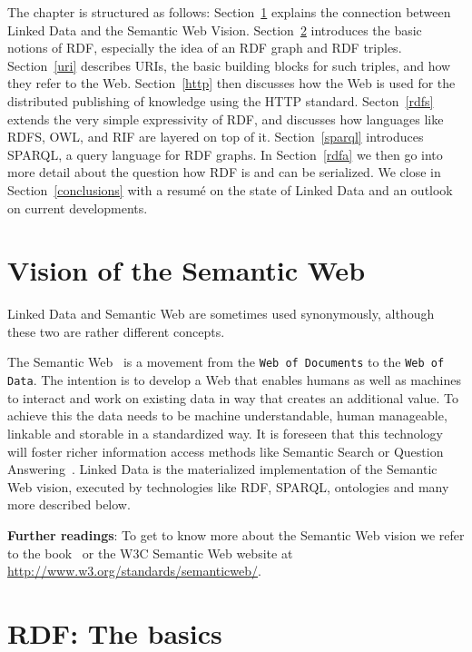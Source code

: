 The chapter is structured as follows:
Section~\ref{semanticweb} explains the connection between Linked Data and the Semantic Web Vision.
Section~\ref{rdf} introduces the basic notions of RDF, especially the idea of an RDF graph and RDF triples.
Section~\ref{uri} describes URIs, the basic building blocks for such triples, and how they refer to the Web.
Section~\ref{http} then discusses how the Web is used for the distributed publishing of knowledge using the HTTP standard.
Secton~\ref{rdfs} extends the very simple expressivity of RDF, and discusses how languages like RDFS, OWL, and RIF are layered on top of it.
Section~\ref{sparql} introduces SPARQL, a query language for RDF graphs.
In Section~\ref{rdfa} we then go into more detail about the question how RDF is and can be serialized.
We close in Section~\ref{conclusions} with a resum\'{e} on the state of Linked Data and an outlook on current developments.

\section{Vision of the Semantic Web}
\label{semanticweb}

Linked Data and Semantic Web are sometimes used synonymously, although these two are rather different concepts.

The Semantic Web~\cite{semanticWeb} is a movement from the \texttt{Web of Documents} to the \texttt{Web of Data}.
The intention is to develop a Web that enables humans as well as machines to interact and work on existing data in way that creates an additional value.
To achieve this the data needs to be machine understandable, human manageable, linkable and storable in a standardized way.
It is foreseen that this technology will foster richer information access methods like Semantic Search or Question Answering~\cite{combiningLDandIR}.
Linked Data is the materialized implementation of the Semantic Web vision, executed by technologies like RDF, SPARQL, ontologies and many more described below.

\medskip

\textbf{Further readings}:
To get to know more about the Semantic Web vision we refer to the book~\cite{swbook} or the W3C Semantic Web website at \url{http://www.w3.org/standards/semanticweb/}.

\section{RDF: The basics}
\label{rdf}


